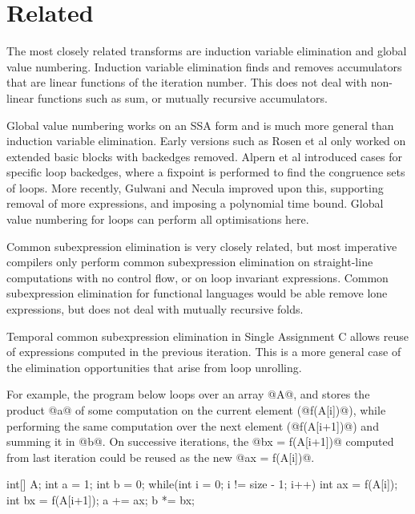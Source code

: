 \section{Related}
\label{s:Related}

The most closely related transforms are induction variable elimination\cite{shivers1988control} and global value numbering\cite{rosen1988global}.
Induction variable elimination finds and removes accumulators that are linear functions of the iteration number.
This does not deal with non-linear functions such as sum, or mutually recursive accumulators.

Global value numbering works on an SSA form and is much more general than induction variable elimination.
Early versions such as Rosen et al\cite{rosen1988global} only worked on extended basic blocks with backedges removed.
Alpern et al\cite{alpern1988detecting} introduced cases for specific loop backedges, where a fixpoint is performed to find the congruence sets of loops.
More recently, Gulwani and Necula\cite{gulwani2004polynomial} improved upon this, supporting removal of more expressions, and imposing a polynomial time bound.
Global value numbering for loops can perform all optimisations here.

Common subexpression elimination is very closely related, but most imperative compilers only perform common subexpression elimination on straight-line computations with no control flow\cite{debray1992compiler}, or on loop invariant expressions\cite{bodik1998complete}.
Common subexpression elimination for functional languages would be able remove lone expressions, but does not deal with mutually recursive folds.

Temporal common subexpression elimination in Single Assignment C
allows reuse of expressions computed in the previous iteration\cite{imlig2001loop}.
This is a more general case of the elimination opportunities that arise from loop unrolling.

For example, the program below loops over an array @A@, and stores the product @a@ of some computation on the current element (@f(A[i])@), while performing the same computation over the next element (@f(A[i+1])@) and summing it in @b@.
On successive iterations, the @bx = f(A[i+1])@ computed from last iteration could be reused as the new @ax = f(A[i])@.
\begin{code}
int[] A;
int a = 1;
int b = 0;
while(int i = 0; i != size - 1; i++)  {
  int ax = f(A[i]);
  int bx = f(A[i+1]);
  a += ax;
  b *= bx;
}
\end{code}

